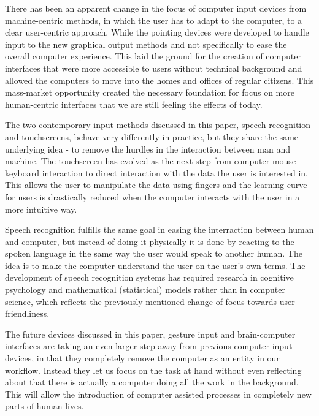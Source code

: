 There has been an apparent change in the focus of computer input devices from machine-centric methods, in which the user has to adapt to the computer, to a clear user-centric approach. While the pointing devices were developed to handle input to the new graphical output methods and not specifically to ease the overall computer experience. This laid the ground for the creation of computer interfaces that were more accessible to users without technical background and allowed the computers to move into the homes and offices of regular citizens. This mass-market opportunity created the necessary foundation for focus on more human-centric interfaces that we are still feeling the effects of today.


The two contemporary input methods discussed in this paper, speech recognition and touchscreens, behave very differently in practice, but they share the same underlying idea - to remove the hurdles in the interaction between man and machine. The touchscreen has evolved as the next step from computer-mouse-keyboard interaction to direct interaction with the data the user is interested in. This allows the user to manipulate the data using fingers and the learning curve for users is drastically reduced when the computer interacts with the user in a more intuitive way.

Speech recognition fulfills the same goal in easing the interraction between human and computer, but instead of doing it physically it is done by reacting to the spoken language in the same way the user would speak to another human. The idea is to make the computer understand the user on the user's own terms. The development of speech recognition systems has required research in cognitive psychology and mathematical (statistical) models rather than in computer science, which reflects the previously mentioned change of focus towards user-friendliness. 


The future devices discussed in this paper, gesture input and brain-computer interfaces are taking an even larger step away from previous computer input devices, in that they completely remove the computer as an entity in our workflow. Instead they let us focus on the task at hand without even reflecting about that there is actually a computer doing all the work in the background. This will allow the introduction of computer assisted processes in completely new parts of human lives. 

